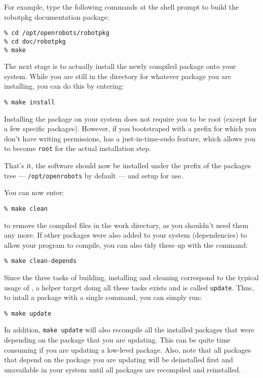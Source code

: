 For  example,  type the following  commands  at the shell   prompt to build the
robotpkg documentation package:

\begin{verbatim}
% cd /opt/openrobots/robotpkg
% cd doc/robotpkg
% make
\end{verbatim}

The next  stage is  to  actually install the newly   compiled package onto your
system. While you   are still in  the directory  for whatever package  you  are
installing, you can do this by entering:

\begin{verbatim}
% make install
\end{verbatim}

Installing the package on your system does  not require you  to be root (except
for a few specific  packages). However, if   you bootstraped with a  prefix for
which   you  don't   have  writing   permissions,    \robotpkg   has a     {\rm
just-in-time-sudo}  feature,  which allows you to  become  {\tt  root}  for the
actual installation step.

That's it, the software should now be installed   under  the prefix  of the
packages tree --- {\tt /opt/openrobots} by default --- and setup for use.

You can now enter:

\begin{verbatim}
% make clean
\end{verbatim}

to remove the compiled files in the work  directory, as you shouldn't need them
any more. If  other packages were also  added to your system (dependencies)  to
allow your program to compile, you can also tidy these up with the command:

\begin{verbatim}
% make clean-depends
\end{verbatim}

Since  the three tasks of building,  installing and  cleaning correspond to the
typical usage of \robotpkg, a helper target doing all these tasks exists and is
called {\tt update}. Thus,  to intall a package  with a single command, you can
simply run:

\begin{verbatim}
% make update
\end{verbatim}

In addition, {\tt  make update} will  also recompile all the installed packages
that were depending on the package that you are updating. This can be quite
time consuming if you are updating a low-level package. Also, note that all
packages that depend on the package you are updating will be deinstalled
first and unavailable in your system until all packages are recompiled and
reinstalled.

